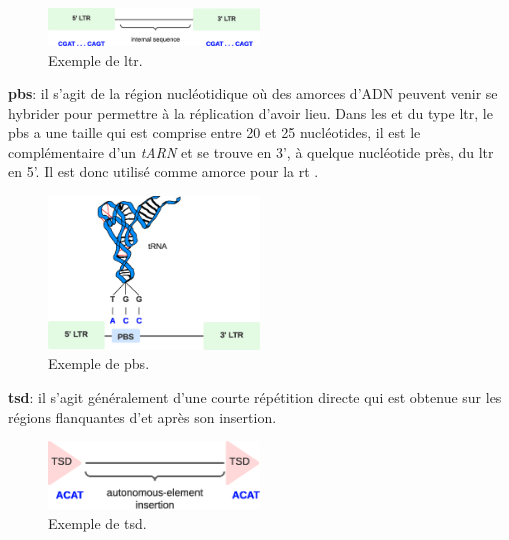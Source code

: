 \documentclass[10pt]{article}
\begin{document}
\bigskip

\begin{figure}[H]
    \centering
    \includegraphics[width=0.5\textwidth]{img/misc/LTR.eps}
    \caption{Exemple de \acrshort{ltr}.}
    \label{fig:LTR_example}
\end{figure}

\bigskip

\textbf{\acrfull{pbs}}: il s'agit de la région nucléotidique où des amorces d'ADN peuvent venir se hybrider pour permettre à la réplication d'avoir lieu. Dans les \acrshort{et} du type \acrshort{ltr}, le \acrshort{pbs} a une taille qui est comprise entre 20 et 25 nucléotides, il est le complémentaire d'un \textit{tARN} et se trouve en 3', à quelque nucléotide près, du \acrshort{ltr} en 5'. Il est donc utilisé comme amorce pour la \acrfull{rt} \cite{wicker}. \\
    
\bigskip

\begin{figure}[H]
    \centering
    \includegraphics[width=0.5\textwidth]{img/misc/PBS.eps}
    \caption{Exemple de \acrshort{pbs}.}
    \label{fig:pbs_exemple}
\end{figure}

\bigskip

\textbf{\acrfull{tsd}}: il s'agit généralement d'une courte répétition directe qui est obtenue sur les régions flanquantes d'\acrshort{et} après son insertion. \\

\bigskip

\begin{figure}[H]
    \centering
    \includegraphics[width=0.5\textwidth]{img/misc/TSD.eps}
    \caption{Exemple de \acrshort{tsd}.}
    \label{fig:TSD_example}
\end{figure}
\end{document}
